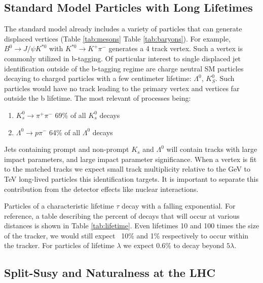 \subsection{Standard Model Particles with Long Lifetimes}

The standard model already includes a variety of particles that can generate
 displaced vertices (Table \ref{tab:mesons} Table \ref{tab:baryons}). 
For example, $B^0 \rightarrow J/\psi K^{*0}$ with $K^{*0} \rightarrow K^+\pi^-$ 
generates a 4 track vertex. Such a vertex is commonly utilized 
in b-tagging. Of particular interest to single displaced jet identification outside of the b-tagging regime are charge neutral SM particles
decaying to charged particles with a few centimeter lifetime: $\Lambda^0$, $K_S^0$. Such particles would have no track
leading to the primary vertex and vertices far outside the b lifetime. The most relevant of processes being:

\begin{enumerate}
\item $K_s^0 \rightarrow \pi^+\pi^-$ 69\% of all $K_s^0$ decays 
\item $\Lambda^0 \rightarrow p \pi^-$ 64\% of all $\Lambda^0$ decays 
\end{enumerate}

Jets containing prompt and non-prompt $K_s$ and $\Lambda^0$ will contain tracks with large impact parameters, 
and large impact parameter significance. When a vertex is fit to the matched tracks we expect small track multiplicity relative 
to the GeV to TeV   long-lived particles this identification targets. It is important to separate this contribution from
the detector effects like nuclear interactions.



Particles of a characteristic lifetime $\tau$ decay with a falling exponential. For reference, 
a table describing the percent of decays that will occur at various distances is shown in Table
 \ref{tab:lifetime}. Even lifetimes 10 and 100 times the size of the tracker, we would still expect
~10\% and 1\% respectively to occur within the tracker. For particles  of lifetime $\lambda$ we
expect 0.6\% to decay beyond $5\lambda$. 



\subsection{Split-Susy and Naturalness at the LHC}

